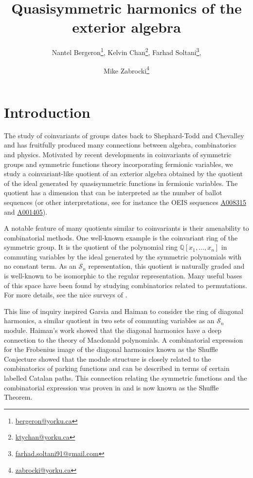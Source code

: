 \documentclass[submission]{FPSAC2023}
\title{Quasisymmetric harmonics of the exterior algebra}
\author{
Nantel Bergeron\thanks{\href{mailto:bergeron@yorku.ca}{bergeron@yorku.ca}}, 
Kelvin Chan\thanks{\href{mailto:ktychan@yorku.ca}{ktychan@yorku.ca}},
Farhad Soltani\thanks{\href{mailto:farhad.soltani91@gmail.com}{farhad.soltani91@gmail.com}}, \and
Mike Zabrocki\thanks{\href{mailto:zabrocki@yorku.ca}{zabrocki@yorku.ca}}
}
\theoremstyle{definition}
\numberwithin{equation}{section}
\begin{document}
\maketitle{}

\section{Introduction}
The study of coinvariants of groups dates back to Shephard-Todd and Chevalley~\cite{ST,Chevalley} and has fruitfully produced many connections between algebra, combinatorics and physics.  Motivated by recent developments in coinvariants of symmetric groups and symmetric functions theory incorporating fermionic variables, we study a coinvariant-like quotient of an exterior algebra obtained by the quotient of the ideal generated by quasisymmetric functions in fermionic variables.  The quotient has a dimension that can be interpreted as the number of ballot sequences (or other interpretations, see for instance the OEIS \cite{OEIS} sequences \href{https://oeis.org/A008315}{A008315} and \href{https://oeis.org/A001405}{A001405}).

A notable feature of many quotients similar to coinvariants is their amenability to combinatorial methods.  One well-known example is the coinvariant ring of the symmetric group.  It is the quotient of the polynomial ring $\mathbb{Q}[x_{1},\dots,x_{n}]$ in commuting variables by the ideal generated by the symmetric polynomials with no constant term.  As an $\mathcal{S}_{n}$ representation, this quotient is naturally graded and is well-known to be isomorphic to the regular representation.  Many useful bases of this space have been found by studying combinatorics related to permutations.  For more details, see the nice surveys of \cite{B, GH, MacSchub, Manivel}.

This line of inquiry inspired Garsia and Haiman \cite{GH96,H} to consider the ring of diagonal harmonics, a similar quotient in two sets of commuting variables as an $\mathcal{S}_{n}$ module.  Haiman's work \cite{H2} showed that the diagonal harmonics have a deep connection to the theory of Macdonald polynomials.  A combinatorial expression for the Frobenius image of the diagonal harmonics known as the Shuffle Conjecture \cite{HHLRU} showed that the module structure is closely related to the combinatorics of parking functions and can be described in terms of certain labelled Catalan paths.  This connection relating the symmetric functions and the combinatorial expression was proven in \cite{CM} and is now known as the Shuffle Theorem.
\end{document}
